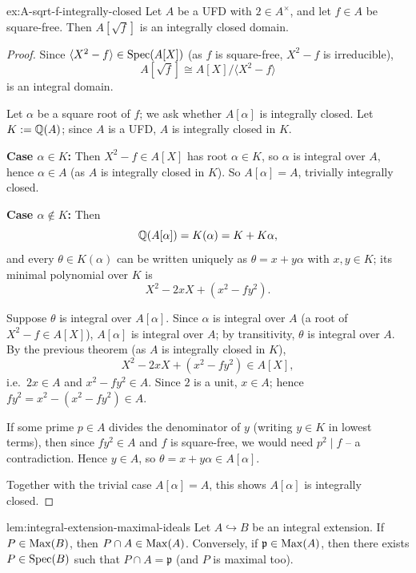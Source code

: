 \begin{example}{}{ex:A-sqrt-f-integrally-closed}
Let $A$ be a UFD with $2 \in A^\times$, and let $f \in A$ be square-free. Then $A[\sqrt f]$ is an integrally closed domain.
\end{example}

\begin{proof}
Since $\langle X^2-f\rangle \in \operatorname{Spec}(A[X])$ (as $f$ is square-free, $X^2-f$ is irreducible),
\[
A[\sqrt f] \cong A[X]/\langle X^2-f \rangle
\]
is an integral domain.

Let $\alpha$ be a square root of $f$; we ask whether $A[\alpha]$ is integrally closed. Let $K := \mathbb{Q}(A)$; since $A$ is a UFD, $A$ is integrally closed in $K$.

\textbf{Case $\alpha \in K$:} Then $X^2-f \in A[X]$ has root $\alpha \in K$, so $\alpha$ is integral over $A$, hence $\alpha \in A$ (as $A$ is integrally closed in $K$). So $A[\alpha]=A$, trivially integrally closed.

\textbf{Case $\alpha \notin K$:} Then
\[
\mathbb{Q}(A[\alpha]) = K(\alpha) = K + K\alpha,
\]
and every $\theta \in K(\alpha)$ can be written uniquely as $\theta = x+y\alpha$ with $x,y \in K$; its minimal polynomial over $K$ is
\[
X^2 - 2xX + (x^2-fy^2).
\]

Suppose $\theta$ is integral over $A[\alpha]$. Since $\alpha$ is integral over $A$ (a root of $X^2-f\in A[X]$), $A[\alpha]$ is integral over $A$; by transitivity, $\theta$ is integral over $A$. By the previous theorem (as $A$ is integrally closed in $K$),
\[
X^2-2xX+(x^2-fy^2) \in A[X],
\]
i.e.\ $2x \in A$ and $x^2-fy^2 \in A$. Since $2$ is a unit, $x \in A$; hence $fy^2 = x^2-(x^2-fy^2) \in A$.

If some prime $p \in A$ divides the denominator of $y$ (writing $y \in K$ in lowest terms), then since $fy^2 \in A$ and $f$ is square-free, we would need $p^2 \mid f$ -- a contradiction. Hence $y \in A$, so $\theta = x+y\alpha \in A[\alpha]$.

Together with the trivial case $A[\alpha]=A$, this shows $A[\alpha]$ is integrally closed.
\end{proof}

\begin{lemma}{}{lem:integral-extension-maximal-ideals}
Let $A \hookrightarrow B$ be an integral extension. If $P \in \operatorname{Max}(B)$, then $P \cap A \in \operatorname{Max}(A)$. Conversely, if $\mathfrak p \in \operatorname{Max}(A)$, then there exists $P \in \operatorname{Spec}(B)$ such that $P \cap A = \mathfrak p$ (and $P$ is maximal too).
\end{lemma}

